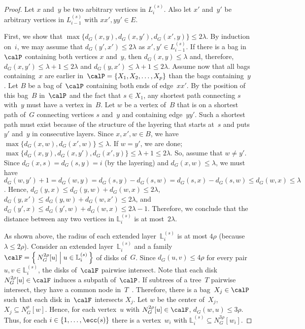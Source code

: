 \begin{proof}
Let $x$ and~$y$ be two arbitrary vertices in $L_{i}^{(s)}$.
Also let $x'$ and~$y'$ be arbitrary vertices in $L_{i-1}^{(s)}$ with $xx', yy' \in E$.

First, we show that $\max \big \{ d_G(x, y), d_G(x, y'), d_G(x', y) \big \} \leq 2 \lambda$.
By induction on~$i$, we may assume that $d_G(y', x') \leq 2 \lambda$ as $x', y' \in L_{i-1}^{(s)}$.
If there is a bag in~$\calP$ containing both vertices $x$ and~$y$, then $d_G(x, y) \leq \lambda$ and, therefore, $d_G(x, y') \leq \lambda + 1 \leq 2 \lambda$ and $d_G(y, x') \leq \lambda + 1 \leq 2 \lambda$.
Assume now that all bags containing~$x$ are earlier in~$\calP = \{ X_1, X_2, \ldots, X_p \}$ than the bags containing~$y$.
Let $B$ be a bag of~$\calP$ containing both ends of edge~$xx'$.
By the position of this bag~$B$ in~$\calP$ and the fact that $s \in X_1$, any shortest path connecting $s$ with~$y$ must have a vertex in~$B$.
Let $w$ be a vertex of~$B$ that is on a shortest path of~$G$ connecting vertices $s$ and~$y$ and containing edge~$yy'$.
Such a shortest path must exist because of the structure of the layering that starts at~$s$ and puts $y'$ and~$y$ in consecutive layers.
Since $x, x', w \in B$, we have $\max \big \{ d_G(x, w), d_G(x', w) \big \} \leq \lambda$.
If $w = y'$, we are done; $\max \big \{ d_G(x, y), d_G(x, y'), d_G(x', y) \big \} \leq \lambda + 1 \leq 2 \lambda$.
So, assume that $w \neq y'$.
Since $d_G(x, s) = d_G(s, y) = i$ (by the layering) and $d_G(x, w) \leq \lambda$, we must have $d_G(w, y') + 1 = d_G(w, y) = d_G(s, y) - d_G(s, w) = d_G(s, x) - d_G(s, w) \leq d_G(w, x) \leq \lambda$.
Hence, $d_G(y, x) \leq d_G(y, w) + d_G(w, x) \leq 2 \lambda$, $d_G(y, x') \leq d_G(y, w) + d_G(w, x') \leq 2 \lambda$, and $d_G(y', x) \leq d_G(y', w) + d_G(w, x) \leq 2 \lambda - 1$.
Therefore, we conclude that the distance between any two vertices in $\mathbb{L}_i^{(s)}$ is at most~$2 \lambda$.

As shown above, the radius of each extended layer~$\mathbb{L}_i^{(s)}$ is at most $4 \rho$ (because $\lambda \leq 2\rho$).
Consider an extended layer~$\mathbb{L}_i^{(s)}$ and a family~$\calF = \Big \{ \, N_G^{2 \rho}[u] \Bigm| u \in \mathbb{L}_i^{(s)} \, \Big \}$ of disks of~$G$.
Since $d_G(u, v) \leq 4 \rho$ for every pair $u, v \in \mathbb{L}_i^{(s)}$, the disks of~$\calF$ pairwise intersect.
Note that each disk~$N_G^{2 \rho}[u] \in \calF$ induces a subpath of~$\calP$.
If subtrees of a tree~$T$ pairwise intersect, they have a common node in~$T$~\cite{Berge1984}.
Therefore, there is a bag~$X_j \in \calP$ such that each disk in~$\calF$ intersects $X_j$.
Let $w$ be the center of~$X_j$, \ie $X_j \subseteq N_G^\rho[w]$.
Hence, for each vertex~$u$ with $N_G^{2 \rho}[u] \in \calF$, $d_G(w, u) \leq 3 \rho$.
Thus, for each $i \in \{ 1, \ldots, \ecc(s) \}$ there is a vertex~$w_i$ with $\mathbb{L}_i^{(s)} \subseteq N_G^{3 \rho}[w_i]$.
\end{proof}

